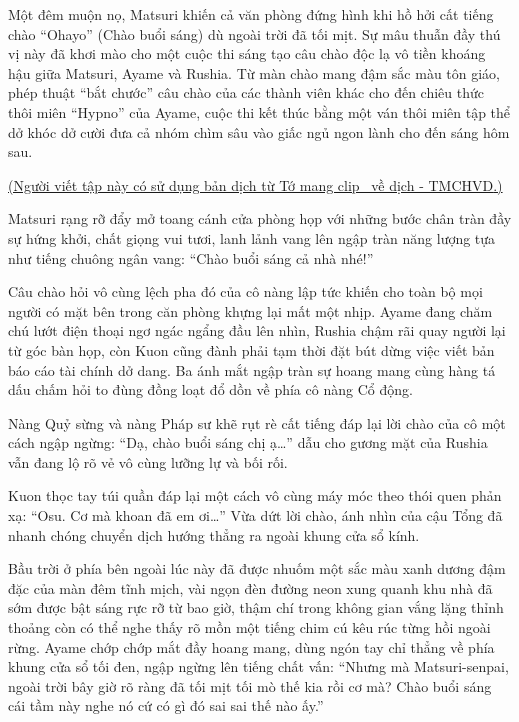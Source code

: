 \documentclass[../main.tex]{subfiles}
\begin{document}
 Một đêm muộn nọ, Matsuri khiến cả văn phòng đứng hình khi hồ hởi cất tiếng chào ``Ohayo'' (Chào buổi sáng) dù ngoài trời đã tối mịt. Sự mâu thuẫn đầy thú vị này đã khơi mào cho một cuộc thi sáng tạo câu chào độc lạ vô tiền khoáng hậu giữa Matsuri, Ayame và Rushia. Từ màn chào mang đậm sắc màu tôn giáo, phép thuật ``bắt chước'' câu chào của các thành viên khác cho đến chiêu thức thôi miên ``Hypno'' của Ayame, cuộc thi kết thúc bằng một ván thôi miên tập thể dở khóc dở cười đưa cả nhóm chìm sâu vào giấc ngủ ngon lành cho đến sáng hôm sau.

\begin{center}
  \uline{(Người viết tập này có sử dụng bản dịch từ \href{[https://www.youtube.com/@TomangclipHololivevedich](https://www.youtube.com/@TomangclipHololivevedich)}{Tớ mang clip \hll\ về dịch - TMCHVD}.)}
\end{center}

Matsuri rạng rỡ đẩy mở toang cánh cửa phòng họp với những bước chân tràn đầy sự hứng khởi, chất giọng vui tươi, lanh lảnh vang lên ngập tràn năng lượng tựa như tiếng chuông ngân vang: ``Chào buổi sáng cả nhà nhé!''

Câu chào hỏi vô cùng lệch pha đó của cô nàng lập tức khiến cho toàn bộ mọi người có mặt bên trong căn phòng khựng lại mất một nhịp. Ayame đang chăm chú lướt điện thoại ngơ ngác ngẩng đầu lên nhìn, Rushia chậm rãi quay người lại từ góc bàn họp, còn Kuon cũng đành phải tạm thời đặt bút dừng việc viết bản báo cáo tài chính dở dang. Ba ánh mắt ngập tràn sự hoang mang cùng hàng tá dấu chấm hỏi to đùng đồng loạt đổ dồn về phía cô nàng Cổ động.

Nàng Quỷ sừng và nàng Pháp sư khẽ rụt rè cất tiếng đáp lại lời chào của cô một cách ngập ngừng: ``Dạ, chào buổi sáng chị ạ\dots'' dẫu cho gương mặt của Rushia vẫn đang lộ rõ vẻ vô cùng lưỡng lự và bối rối.

Kuon thọc tay túi quần đáp lại một cách vô cùng máy móc theo thói quen phản xạ: ``Osu. Cơ mà khoan đã em ơi\dots'' Vừa dứt lời chào, ánh nhìn của cậu Tổng đã nhanh chóng chuyển dịch hướng thẳng ra ngoài khung cửa sổ kính.

Bầu trời ở phía bên ngoài lúc này đã được nhuốm một sắc màu xanh dương đậm đặc của màn đêm tĩnh mịch, vài ngọn đèn đường neon xung quanh khu nhà đã sớm được bật sáng rực rỡ từ bao giờ, thậm chí trong không gian vắng lặng thỉnh thoảng còn có thể nghe thấy rõ mồn một tiếng chim cú kêu rúc từng hồi ngoài rừng. Ayame chớp chớp mắt đầy hoang mang, dùng ngón tay chỉ thẳng về phía khung cửa sổ tối đen, ngập ngừng lên tiếng chất vấn: ``Nhưng mà Matsuri-senpai, ngoài trời bây giờ rõ ràng đã tối mịt tối mò thế kia rồi cơ mà? Chào buổi sáng cái tầm này nghe nó cứ có gì đó sai sai thế nào ấy.''
\end{document}
